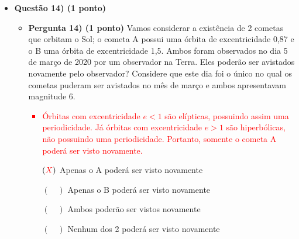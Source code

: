 \documentclass[a4paper, 12pt]{article}
\newcommand{\red}[1]{\textcolor{red}{#1}}
\begin{document}
\begin{flushleft}
\begin{itemize}
            \item \textbf{Questão 14) (1 ponto)}
                \begin{itemize}
                    \item \textbf{Pergunta 14) (1 ponto)} Vamos considerar a existência de 2 cometas que orbitam o Sol; o cometa A possui uma órbita de excentricidade 0,87 e o B uma órbita de excentricidade 1,5. Ambos foram observados no dia 5 de março de 2020 por um observador na Terra. Eles poderão ser avistados novamente pelo observador? Considere que este dia foi o único no qual os cometas puderam ser avistados no mês de março e ambos apresentavam magnitude 6.
                        \red{\begin{itemize}
                            \item Órbitas com excentricidade $e < 1$ são elípticas, possuindo assim uma periodicidade. Já órbitas com excentricidade $e > 1$ são hiperbólicas, não possuindo uma periodicidade. Portanto, somente o cometa A poderá ser visto novamente.
                        \end{itemize}}
                        \begin{itemize}
                            \item[$(\red{X})$] Apenas o A poderá ser visto novamente
                            \item[$(\quad)$] Apenas o B poderá ser visto novamente
                            \item[$(\quad)$] Ambos poderão ser vistos novamente
                            \item[$(\quad)$] Nenhum dos 2 poderá ser visto novamente
                        \end{itemize}
                \end{itemize}
        \end{itemize} \end{flushleft}
\end{document}
